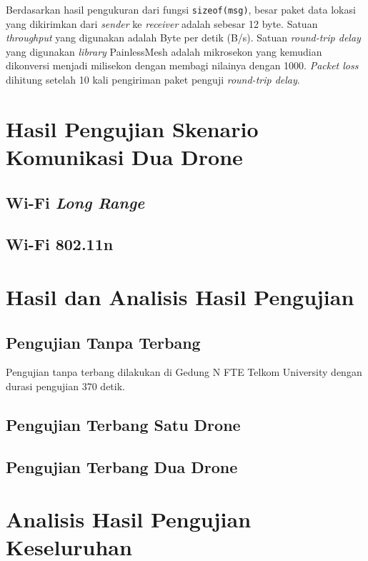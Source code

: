 Berdasarkan hasil pengukuran dari fungsi \verb|sizeof(msg)|, besar paket data lokasi yang dikirimkan dari \textit{sender} ke \textit{receiver} adalah sebesar 12 byte. Satuan \textit{throughput} yang digunakan adalah Byte per detik (B/s).  Satuan \textit{round-trip delay} yang digunakan \textit{library} PainlessMesh adalah mikrosekon yang kemudian dikonversi menjadi milisekon dengan membagi nilainya dengan 1000. \textit{Packet loss} dihitung setelah 10 kali pengiriman paket penguji \textit{round-trip delay}.

\section{Hasil Pengujian Skenario Komunikasi Dua Drone}
\subsection{Wi-Fi \textit{Long Range}}
\subsection{Wi-Fi 802.11n}

\section{Hasil dan Analisis Hasil Pengujian}
\subsection{Pengujian Tanpa Terbang}
Pengujian tanpa terbang dilakukan di Gedung N FTE Telkom University dengan durasi pengujian 370 detik.
\subsection{Pengujian Terbang Satu Drone}
\subsection{Pengujian Terbang Dua Drone}

\section{Analisis Hasil Pengujian Keseluruhan}